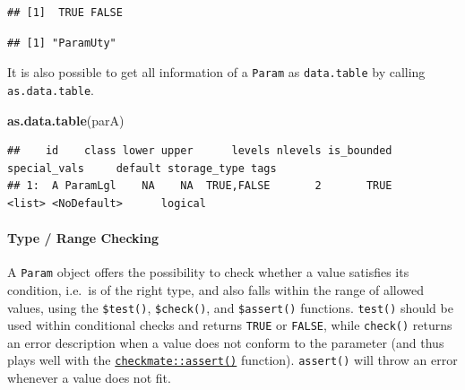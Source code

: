 \documentclass[]{scrbook}
\newenvironment{Shaded}{\begin{snugshade}}{\end{snugshade}}
\newcommand{\KeywordTok}[1]{\textcolor[rgb]{0.13,0.29,0.53}{\textbf{#1}}}
\newcommand{\NormalTok}[1]{#1}
\newcommand{\OperatorTok}[1]{\textcolor[rgb]{0.81,0.36,0.00}{\textbf{#1}}}
\newcommand{\OtherTok}[1]{\textcolor[rgb]{0.56,0.35,0.01}{#1}}
\let\oldparagraph\paragraph
\renewcommand{\paragraph}[1]{\oldparagraph{#1}\mbox{}}
\renewenvironment{Shaded} {\begin{snugshade}\small} {\end{snugshade}}
\begin{document}
\begin{verbatim}
## [1]  TRUE FALSE
\end{verbatim}

\begin{Shaded}
\end{Shaded}

\begin{verbatim}
## [1] "ParamUty"
\end{verbatim}

It is also possible to get all information of a \texttt{Param} as \texttt{data.table} by calling \texttt{as.data.table}.

\begin{Shaded}
\begin{Highlighting}[]
\KeywordTok{as.data.table}\NormalTok{(parA)}
\end{Highlighting}
\end{Shaded}

\begin{verbatim}
##    id    class lower upper      levels nlevels is_bounded special_vals     default storage_type tags
## 1:  A ParamLgl    NA    NA  TRUE,FALSE       2       TRUE       <list> <NoDefault>      logical
\end{verbatim}

\hypertarget{type-range-checking}{%
\paragraph{Type / Range Checking}\label{type-range-checking}}

A \texttt{Param} object offers the possibility to check whether a value satisfies its condition, i.e.~is of the right type, and also falls within the range of allowed values, using the \texttt{\$test()}, \texttt{\$check()}, and \texttt{\$assert()} functions.
\texttt{test()} should be used within conditional checks and returns \texttt{TRUE} or \texttt{FALSE}, while \texttt{check()} returns an error description when a value does not conform to the parameter (and thus plays well with the \href{https://www.rdocumentation.org/packages/checkmate/topics/assert}{\texttt{checkmate::assert()}} function).
\texttt{assert()} will throw an error whenever a value does not fit.

\begin{Shaded}
\end{Shaded}
\end{document}

